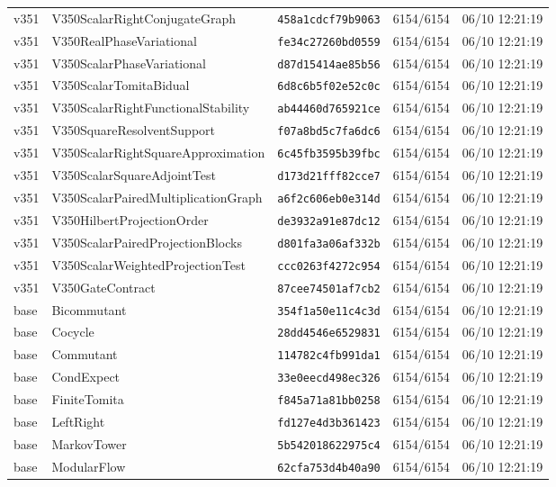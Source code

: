 \documentclass[11pt]{article}
\theoremstyle{definition}\newtheorem{deriv}{Derivation}
\begin{document}
{\begin{longtable}{@{}lllll@{}}
v351 & V350ScalarRightConjugateGraph & \texttt{458a1cdcf79b9063} & 6154/6154 & 06/10 12:21:19 \\
v351 & V350RealPhaseVariational & \texttt{fe34c27260bd0559} & 6154/6154 & 06/10 12:21:19 \\
v351 & V350ScalarPhaseVariational & \texttt{d87d15414ae85b56} & 6154/6154 & 06/10 12:21:19 \\
v351 & V350ScalarTomitaBidual & \texttt{6d8c6b5f02e52c0c} & 6154/6154 & 06/10 12:21:19 \\
v351 & V350ScalarRightFunctionalStability & \texttt{ab44460d765921ce} & 6154/6154 & 06/10 12:21:19 \\
v351 & V350SquareResolventSupport & \texttt{f07a8bd5c7fa6dc6} & 6154/6154 & 06/10 12:21:19 \\
v351 & V350ScalarRightSquareApproximation & \texttt{6c45fb3595b39fbc} & 6154/6154 & 06/10 12:21:19 \\
v351 & V350ScalarSquareAdjointTest & \texttt{d173d21fff82cce7} & 6154/6154 & 06/10 12:21:19 \\
v351 & V350ScalarPairedMultiplicationGraph & \texttt{a6f2c606eb0e314d} & 6154/6154 & 06/10 12:21:19 \\
v351 & V350HilbertProjectionOrder & \texttt{de3932a91e87dc12} & 6154/6154 & 06/10 12:21:19 \\
v351 & V350ScalarPairedProjectionBlocks & \texttt{d801fa3a06af332b} & 6154/6154 & 06/10 12:21:19 \\
v351 & V350ScalarWeightedProjectionTest & \texttt{ccc0263f4272c954} & 6154/6154 & 06/10 12:21:19 \\
v351 & V350GateContract & \texttt{87cee74501af7cb2} & 6154/6154 & 06/10 12:21:19 \\
base & Bicommutant & \texttt{354f1a50e11c4c3d} & 6154/6154 & 06/10 12:21:19 \\
base & Cocycle & \texttt{28dd4546e6529831} & 6154/6154 & 06/10 12:21:19 \\
base & Commutant & \texttt{114782c4fb991da1} & 6154/6154 & 06/10 12:21:19 \\
base & CondExpect & \texttt{33e0eecd498ec326} & 6154/6154 & 06/10 12:21:19 \\
base & FiniteTomita & \texttt{f845a71a81bb0258} & 6154/6154 & 06/10 12:21:19 \\
base & LeftRight & \texttt{fd127e4d3b361423} & 6154/6154 & 06/10 12:21:19 \\
base & MarkovTower & \texttt{5b542018622975c4} & 6154/6154 & 06/10 12:21:19 \\
base & ModularFlow & \texttt{62cfa753d4b40a90} & 6154/6154 & 06/10 12:21:19 \\

\end{longtable}}
\end{document}
